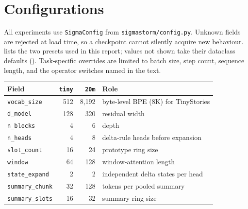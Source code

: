 \appendix

\section{Configurations}
\label{app:configs}

All experiments use \texttt{SigmaConfig} from \texttt{sigmastorm/config.py}. Unknown fields
are rejected at load time, so a checkpoint cannot silently acquire new behaviour. 
lists the two presets used in this report; values not shown take their dataclass defaults
(). Task-specific overrides are limited to batch size, step count, sequence
length, and the operator switches named in the text.

\begin{center}
\small
{}
\label{tab:presets}
\begin{tabularx}{\textwidth}{@{}l r r X@{}}
\toprule
Field & \texttt{tiny} & \texttt{20m} & Role \\
\midrule
\texttt{vocab\_size} & 512 & 8{,}192 & byte-level BPE (8K) for TinyStories \\
\texttt{d\_model} & 128 & 320 & residual width \\
\texttt{n\_blocks} & 4 & 6 & depth \\
\texttt{n\_heads} & 4 & 8 & delta-rule heads before expansion \\
\texttt{slot\_count} & 16 & 24 & prototype ring size \\
\texttt{window} & 64 & 128 & window-attention length \\
\texttt{state\_expand} & 2 & 2 & independent delta states per head \\
\texttt{summary\_chunk} & 32 & 128 & tokens per pooled summary \\
\texttt{summary\_slots} & 16 & 32 & summary ring size \\
\bottomrule
\end{tabularx}
\end{center}


